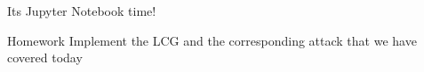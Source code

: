 \documentclass{beamer}
\begin{document}
\begin{frame}
    Its Jupyter Notebook time!
\end{frame}

\begin{frame}{Homework}
    Implement the LCG and the corresponding attack that we have covered today
\end{frame}

% 	
% 	
\end{document}
